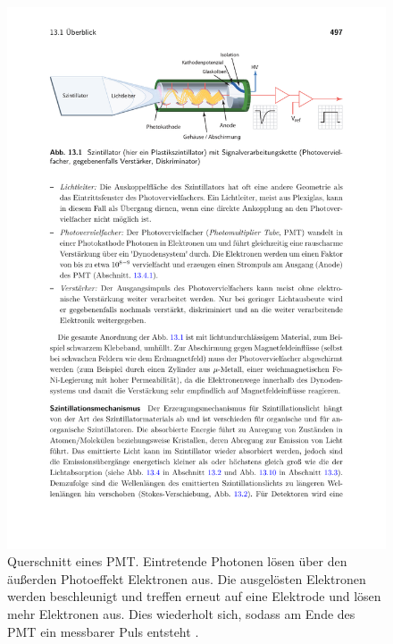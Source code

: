 \begin{figure}
    \centering
    \includegraphics[width=.8\textwidth]{content/pics/PMT.pdf}
    \caption{Querschnitt eines PMT. Eintretende Photonen lösen über den äußerden Photoeffekt Elektronen aus. Die ausgelösten Elektronen werden beschleunigt und treffen erneut %
    auf eine Elektrode und lösen mehr Elektronen aus. Dies wiederholt sich, sodass am Ende des PMT ein messbarer Puls entsteht \cite{Wermes}.}
    \label{fig:PMT}
 \end{figure}


